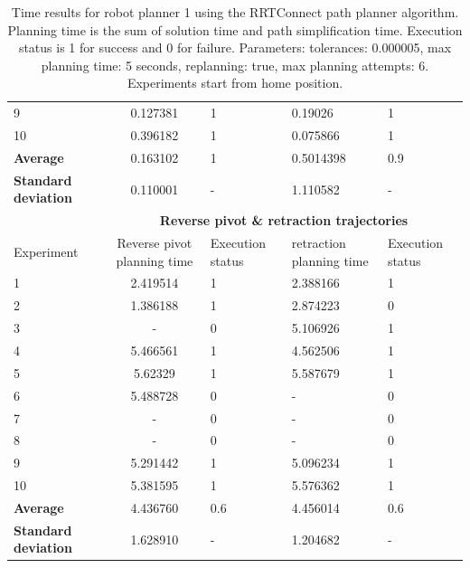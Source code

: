 \begin{table}[H]
\begin{tabular}{|p{2cm}|c|p{2cm}|p{2cm}|p{2cm}|}
9	& 0.127381	& 1	& 0.19026	& 1 \\
10	& 0.396182	& 1	& 0.075866	& 1 \\
\hline
\textbf{Average} & 	0.163102 & 1	& 0.5014398 &	0.9 \\
\hline
\textbf{Standard deviation} & 	0.110001 &	- &	1.110582 & - \\
\hline
                          & \multicolumn{4}{c}{\textbf{Reverse pivot \& retraction trajectories}}                     \vline \\
\hline
Experiment                & Reverse pivot planning time & Execution status & retraction planning time & Execution status  \\
\hline
1 & 2.419514	& 1	& 2.388166	& 1 \\
2 & 1.386188	& 1	& 2.874223	& 0 \\
3 & -	& 0	& 5.106926	& 1 \\
4 & 5.466561	& 1	& 4.562506	& 1 \\
5 & 5.62329	& 1	& 5.587679	& 1 \\
6 & 5.488728	& 0	& -	& 0 \\
7 & -	& 0	& -	& 0 \\
8 & -	& 0	& -	& 0 \\
9 & 5.291442	& 1	& 5.096234	& 1 \\
10 & 5.381595	& 1	& 5.576362	& 1 \\
\hline
\textbf{Average} & 	4.436760	& 0.6	& 4.456014	& 0.6 \\
\hline
\textbf{Standard deviation} & 	1.628910 &	- &	1.204682 & - \\
\hline
\end{tabular}
\caption{Time results for robot planner 1 using the RRTConnect path planner algorithm. Planning time is the sum of solution time and path simplification time. Execution status is 
1 for success and 0 for failure. Parameters: tolerances: 0.000005, max planning time: 5 seconds, replanning: true, max planning attempts: 6. Experiments start from home position.}
\label{robot-planner1-rrtconnect-data}
\end{table}


